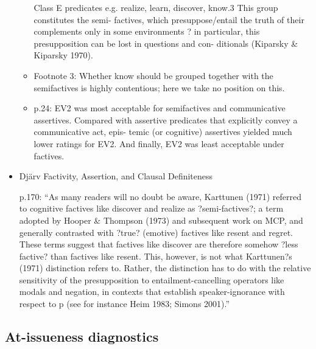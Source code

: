 \documentclass[11pt,fleqn]{article}
\newcommand{\6}{\mbox{$[\hspace*{-.6mm}[$}}
\newcommand{\9}{\mbox{$]\hspace*{-.6mm}]$}}
\begin{document}
\begin{itemize}
\begin{itemize}
{Class E predicates e.g. realize, learn, discover, know.3 This group constitutes the semi- factives, which presuppose/entail the truth of their complements only in some environments ? in particular, this presupposition can be lost in questions and con- ditionals (Kiparsky \& Kiparsky 1970).}

\item Footnote 3: Whether know should be grouped together with the semifactives is highly contentious; here we take no position on this.

\item p.24: EV2 was most acceptable for semifactives and communicative assertives. Compared with assertive predicates that explicitly convey a communicative act, epis- temic (or cognitive) assertives yielded much lower ratings for EV2. And finally, EV2 was least acceptable under factives. 

\end{itemize}

\item Dj\"arv Factivity, Assertion, and Clausal Definiteness

p.170: ``As many readers will no doubt be aware, Karttunen (1971) referred to cognitive factives like discover
and realize as ?semi-factives?; a term adopted by Hooper & Thompson (1973) and subsequent work on
MCP, and generally contrasted with ?true? (emotive) factives like resent and regret. These terms suggest
that factives like discover are therefore somehow ?less factive? than factives like resent. This, however,
is not what Karttunen?s (1971) distinction refers to. Rather, the distinction has to do with the relative sensitivity of the presupposition to entailment-cancelling operators like modals and negation, in contexts
that establish speaker-ignorance with respect to p (see for instance Heim 1983; Simons 2001).''

\end{itemize}

\subsection{At-issueness diagnostics}\label{s:ai-diagnostics}
\end{document}

